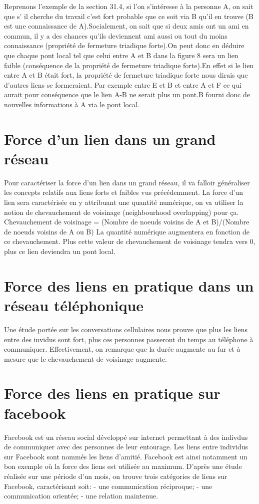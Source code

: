 Reprenons l'exemple de la section 31.4, si l'on s'intéresse à la personne A, on sait que s' il cherche du travail c'est fort probable que ce soit via B qu'il en trouve (B est une connaissance de A).Socialement, on sait que si deux amis ont un ami en commun, il y a des chances qu'ils deviennent ami aussi ou tout du moins connaissance (propriété de fermeture triadique forte).On peut donc en déduire que chaque pont local tel que celui entre A et B dans la figure 8 sera un lien faible (conséquence de la propriété de fermeture triadique forte).En effet si le lien entre A et B était fort, la propriété de fermeture triadique forte nous dirais que d'autres liens se formeraient. Par exemple entre E et B et entre A et F ce qui aurait pour conséquence que le lien A-B ne serait plus un pont.B fourni donc de nouvelles informations à A via le pont local.
\newline
\section{Force d'un lien dans un grand réseau}
Pour caractériser la force d'un lien dans un grand réseau, il va falloir généraliser les concepts relatifs aux liens forts et faibles vus précédemment.
La force d'un lien sera caractérisée en y attribuant une quantité numérique, on va utiliser la notion de chevauchement de voisinage (neighbourhood overlapping) pour ça.
Chevauchement de voisinage = (Nombre de noeuds voisins de A et B)/(Nombre de noeuds voisins de A ou B)
La quantité numérique augmentera en fonction de ce chevauchement. Plus cette valeur de chevauchement de voisinage tendra vers 0, plus ce lien deviendra un pont local.
\newline
\section{Force des liens en pratique dans un réseau téléphonique}
Une étude portée sur les conversations cellulaires nous prouve que plus les liens entre des invidus sont fort, plus ces personnes passeront du temps au téléphone à communiquer. Effectivement, on remarque que la durée augmente au fur et à mesure que le chevauchement de voisinage augmente.
\newline
\section{Force des liens en pratique sur facebook}
Facebook est un réseau social développé sur internet permettant à des indivdus de communiquer avec des personnes de leur entourage.
Les liens entre individus sur Facebook sont nommés les liens d'amitié.
Facebook est ainsi notamment un bon exemple où la force des liens est utilisée au maximum.
D'après une étude réalisée sur une période d'un mois, on trouve trois catégories de liens sur Facebook, caractérisant soit:
- une communication réciproque;
- une communication orientée;
- une relation maintenue.


